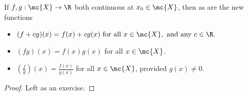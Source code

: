 \begin{nproposition}{}
	If \(f,g:\mc{X}\to\R\) both continuous at \(x_0\in\mc{X}\), then as are the new functions
	\begin{itemize}
		\item \((f+cg)(x)=f(x)+cg(x)~\text{for all}~x\in\mc{X},~\text{and any}~c\in\R.\)
		
		\item \((fg)(x)=f(x)g(x)\) for all \(x\in\mc{X}\).
		
		\item \(\displaystyle\left(\frac{f}{g}\right)(x)=\displaystyle\frac{f(x)}{g(x)}\) for all \(x\in\mc{X}\), provided \(g(x)\neq 0\).
	\end{itemize}
\end{nproposition}
\begin{proof}
	Left as an exercise.
\end{proof}

